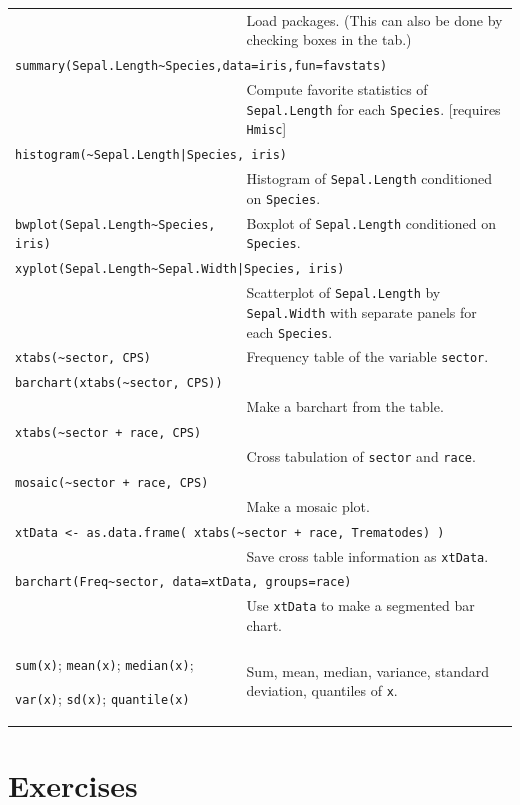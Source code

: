\begin{center}
\begin{longtable}{p{2.45in}p{3.30in}}
\ 
& Load packages.  
(This can also be done by checking boxes in the \tab{Packages} tab.)
\\[3mm]
\multicolumn{2}{l}{
\texttt{summary(Sepal.Length\~{}Species,data=iris,fun=favstats) } 
}
\\[1mm]
& 
Compute favorite statistics of \verb!Sepal.Length! for each \verb!Species!.
[requires \verb!Hmisc!]
\\[3mm]
\multicolumn{2}{l}{\texttt{histogram(\~{}Sepal.Length|Species, iris)}}
\\[1mm]
& 
Histogram of \verb!Sepal.Length! conditioned on \verb!Species!.
\\[3mm]
\verb!bwplot(Sepal.Length~Species, iris)! & 
Boxplot of \verb!Sepal.Length! conditioned on \verb!Species!.
\\[3mm]
\multicolumn{2}{l}{\texttt{xyplot(Sepal.Length\~{}Sepal.Width|Species, iris)}} 
\\[1mm]
& 
Scatterplot of \verb!Sepal.Length! by \verb!Sepal.Width! 
with separate panels for each  \verb!Species!.
\\[3mm]
\verb!xtabs(~sector, CPS)! & Frequency table of the variable \verb!sector!.
\\[3mm]
\multicolumn{2}{l}{\texttt{barchart(xtabs(\~{}sector, CPS))}}
\\[1mm]
& Make a barchart from the table.
\\[3mm]
\multicolumn{2}{l}{\texttt{xtabs(\~{}sector + race, CPS)}}
\\[1mm]
& Cross tabulation of \verb!sector!  and \verb!race!.
\\[3mm]
\multicolumn{2}{l}{
\texttt{mosaic(\~{}sector + race, CPS)} }
\\[1mm]
& Make a mosaic plot.
\\[3mm]
\multicolumn{2}{l}{
\texttt{xtData <- as.data.frame( xtabs(\~{}sector + race, Trematodes) )}}
\\[1mm]
  & Save cross table information as \verb!xtData!. 
\\[3mm]
\multicolumn{2}{l}{
\texttt{barchart(Freq\~{}sector, data=xtData, groups=race)}
}
\\[1mm]
& Use \verb!xtData! to make a segmented bar chart.
\\[3mm]
\verb!sum(x)!; 
\verb!mean(x)!; 
\verb!median(x)!;

\verb!var(x)!; 
\verb!sd(x)!; 
\verb!quantile(x)!
& Sum, mean, 
median,
variance,
standard deviation,
quantiles of \verb!x!.
\\
\end{longtable}
\end{center}

\vspace*{-.5in}
\section{Exercises}


\shipoutProblems


